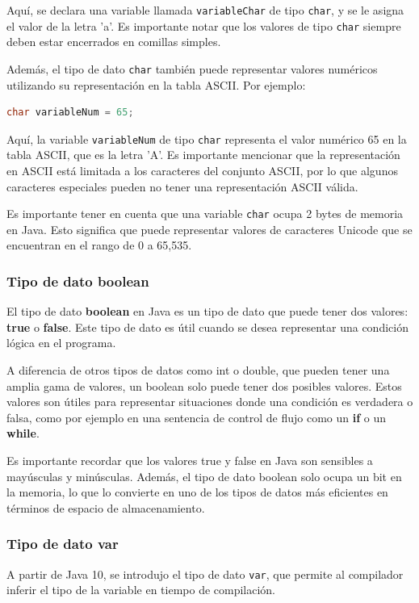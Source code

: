 \documentclass[executivepaper]{article}
\begin{document}
Aquí, se declara una variable llamada \lstinline{variableChar} de tipo \lstinline{char}, y se le asigna el valor de la letra 'a'. Es importante notar que los valores de tipo \lstinline{char} siempre deben estar encerrados en comillas simples.

Además, el tipo de dato \lstinline{char} también puede representar valores numéricos utilizando su representación en la tabla ASCII. Por ejemplo:

\begin{lstlisting}[language=Java]
char variableNum = 65;
\end{lstlisting}

Aquí, la variable \lstinline{variableNum} de tipo \lstinline{char} representa el valor numérico 65 en la tabla ASCII, que es la letra 'A'. Es importante mencionar que la representación en ASCII está limitada a los caracteres del conjunto ASCII, por lo que algunos caracteres especiales pueden no tener una representación ASCII válida.

Es importante tener en cuenta que una variable \lstinline{char} ocupa 2 bytes de memoria en Java. Esto significa que puede representar valores de caracteres Unicode que se encuentran en el rango de 0 a 65,535.

\subsubsection*{Tipo de dato boolean}
El tipo de dato \textbf{boolean} en Java es un tipo de dato que puede tener dos valores: \textbf{true} o \textbf{false}. Este tipo de dato es útil cuando se desea representar una condición lógica en el programa.

A diferencia de otros tipos de datos como int o double, que pueden tener una amplia gama de valores, un boolean solo puede tener dos posibles valores. Estos valores son útiles para representar situaciones donde una condición es verdadera o falsa, como por ejemplo en una sentencia de control de flujo como un \textbf{if} o un \textbf{while}.

Es importante recordar que los valores true y false en Java son sensibles a mayúsculas y minúsculas. Además, el tipo de dato boolean solo ocupa un bit en la memoria, lo que lo convierte en uno de los tipos de datos más eficientes en términos de espacio de almacenamiento.

\subsubsection*{Tipo de dato var}
A partir de Java 10, se introdujo el tipo de dato \texttt{var}, que permite al compilador inferir el tipo de la variable en tiempo de compilación.
\end{document}
